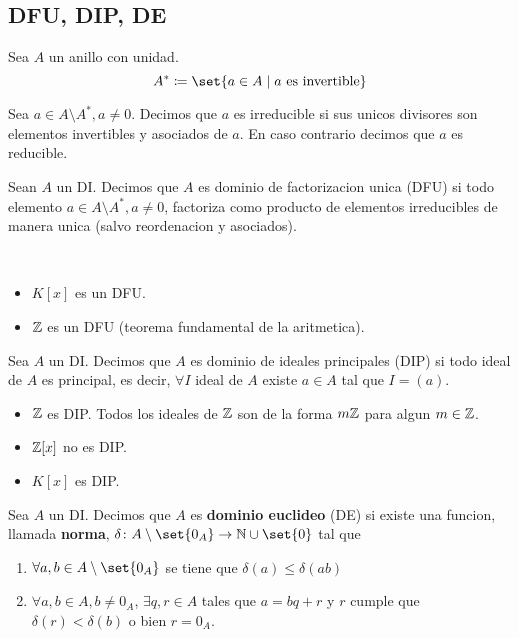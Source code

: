 \subsection{DFU, DIP, DE}
\begin{definition}
	Sea \(A \) un anillo con unidad.
	\[
		A^{*} \coloneqq \set{a \in A \mid a \text{ es invertible} }
	\]
\end{definition}
\begin{definition}
	Sea \(a \in A \setminus A^{*}, a \neq 0 \). Decimos que \(a \) es irreducible si sus unicos divisores son elementos invertibles y asociados de \(a \). En caso contrario decimos que \(a \) es reducible.
\end{definition}
\begin{definition}[DFU]
	Sean \(A \) un DI. Decimos que \(A \) es dominio de factorizacion unica (DFU) si todo elemento \(a \in A \setminus A^{*}, a \neq 0  \), factoriza como producto de elementos irreducibles de manera unica (salvo reordenacion y asociados).
\end{definition}
\begin{example}
	~\begin{itemize}
		\item \(K[x ]\) es un DFU.
		\item \(\mathbb{Z} \) es un DFU (teorema fundamental de la aritmetica).
	\end{itemize}
\end{example}
\begin{definition}[DIP]
	Sea \(A \) un DI. Decimos que \(A\) es dominio de ideales principales (DIP) si todo ideal de \(A \) es principal, es decir, \(\forall I \) ideal de \(A \) existe \(a \in A \) tal que \(I = (a )\).
\end{definition}
\begin{example}
	\begin{itemize}
		\item \(\mathbb{Z} \) es DIP. Todos los ideales de \(\mathbb{Z} \) son de la forma \(m\mathbb{Z} \) para algun \( m \in \mathbb{Z} \).
		\item \(\mathbb{Z}[x ]\) no es DIP.
		\item \(K[x ]\) es DIP.
	\end{itemize}
\end{example}
\begin{definition}[DE]
	Sea \(A \) un DI. Decimos que \(A \) es \textbf{dominio euclideo} (DE) si existe una funcion, llamada \textbf{norma}, \(\delta \colon A \setminus \set{0_A} \rightarrow \N \cup \set{0 }\) tal que
	\begin{enumerate}
		\item \(\forall a,b \in A \setminus \set{0_A }\) se tiene que \(\delta(a) \leq \delta(ab )\)
		\item \(\forall a,b \in A, b \neq 0_A \), \(\exists q,r \in A \) tales que \(a = bq + r \) y \(r \) cumple que \(\delta(r) < \delta(b )\) o bien \(r = 0_A \).
	\end{enumerate}
\end{definition}
